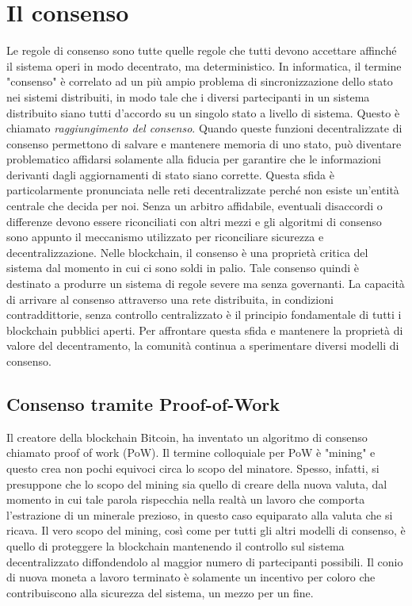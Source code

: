 \section{Il consenso}
\label{ethereum-il-consenso}
Le regole di consenso sono tutte quelle regole che tutti devono accettare affinché il sistema operi in modo decentrato, ma deterministico. In informatica, il termine "consenso" è correlato ad un più ampio problema di sincronizzazione dello stato nei sistemi distribuiti, in modo tale che i diversi partecipanti in un sistema distribuito siano tutti d'accordo su un singolo stato a livello di sistema. Questo è chiamato \textit{raggiungimento del consenso}. Quando queste funzioni decentralizzate di consenso permettono di salvare e mantenere memoria di uno stato, può diventare problematico affidarsi solamente alla fiducia per garantire che le informazioni derivanti dagli aggiornamenti di stato siano corrette. Questa sfida è particolarmente pronunciata nelle reti decentralizzate perché non esiste un'entità centrale che decida per noi. Senza un arbitro affidabile, eventuali disaccordi o differenze devono essere riconciliati con altri mezzi e gli algoritmi di consenso sono appunto il meccanismo utilizzato per riconciliare sicurezza e decentralizzazione. Nelle blockchain, il consenso è una proprietà critica del sistema dal momento in cui ci sono soldi in palio. Tale consenso quindi è destinato a produrre un sistema di regole severe ma senza governanti. La capacità di arrivare al consenso attraverso una rete distribuita, in condizioni contraddittorie, senza controllo centralizzato è il principio fondamentale di tutti i blockchain pubblici aperti. Per affrontare questa sfida e mantenere la proprietà di valore del decentramento, la comunità continua a sperimentare diversi modelli di consenso.

\subsection{Consenso tramite Proof-of-Work}
Il creatore della blockchain Bitcoin, ha inventato un algoritmo di consenso chiamato proof of work (PoW). Il termine colloquiale per PoW è "mining" e questo crea non pochi equivoci circa lo scopo del minatore. Spesso, infatti, si presuppone che lo scopo del mining sia quello di creare della nuova valuta, dal momento in cui tale parola rispecchia nella realtà un lavoro che comporta l'estrazione di un minerale prezioso, in questo caso equiparato alla valuta che si ricava. Il vero scopo del mining, così come per tutti gli altri modelli di consenso, è quello di proteggere la blockchain mantenendo il controllo sul sistema decentralizzato diffondendolo al maggior numero di partecipanti possibili. Il conio di nuova moneta a lavoro terminato è solamente un incentivo per coloro che contribuiscono alla sicurezza del sistema, un mezzo per un fine.

